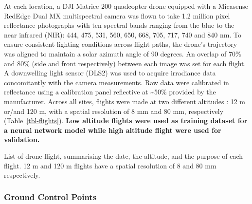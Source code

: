 \documentclass[
  number]{elsarticle}
\begin{document}
At each location, a DJI Matrice 200 quadcopter drone equipped with a
Micasense RedEdge Dual MX multispectral camera was flown to take 1.2
million pixel reflectance photographs with ten spectral bands ranging
from the blue to the near infrared (NIR): 444, 475, 531, 560, 650, 668,
705, 717, 740 and 840 nm. To ensure consistent lighting conditions
across flight paths, the drone's trajectory was aligned to maintain a
solar azimuth angle of 90 degrees. An overlap of 70\% and 80\% (side and
front respectively) between each image was set for each flight. A
downwelling light sensor (DLS2) was used to acquire irradiance data
concomitantly with the camera measurements. Raw data were calibrated in
reflectance using a calibration panel reflective at \textasciitilde50\%
provided by the manufacturer. Across all sites, flights were made at two
different altitudes : 12 m or/and 120 m, with a spatial resolution of 8
mm and 80 mm, respectively (Table~\ref{tbl-flights}). \textbf{Low
altitude flights were used as training dataset for a neural network
model while high altitude flight were used for validation.}

\begin{table}

\caption{\label{tbl-flights}List of drone flight, summarising the date,
the altitude, and the purpose of each flight. 12 m and 120 m flights
have a spatial resolution of 8 and 80 mm respectively.}


\end{table}%

\subsubsection{Ground Control Points}\label{ground-control-points}
\end{document}

